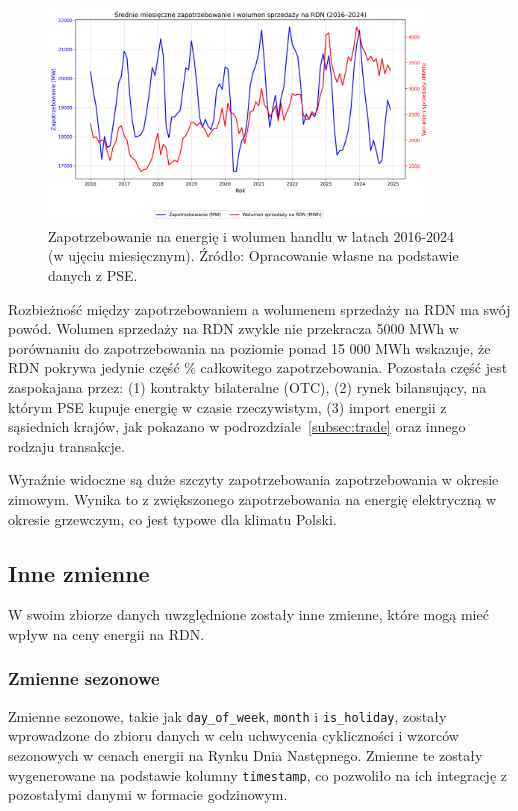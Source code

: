 \begin{figure}[H]
    \centering
    \includegraphics[width=0.9\textwidth]{../plots/market/load_vs_volume_2016_2024.png}
    \caption{Zapotrzebowanie na energię i wolumen handlu w latach 2016-2024 (w ujęciu miesięcznym). Źródło: Opracowanie własne na podstawie danych z PSE.}
    \label{fig:load_vs_trade_volume}
\end{figure}

Rozbieżność między zapotrzebowaniem a wolumenem sprzedaży na RDN ma swój powód. Wolumen sprzedaży na RDN zwykle nie przekracza 5000 MWh w porównaniu do zapotrzebowania na poziomie ponad 15 000  MWh wskazuje, że RDN pokrywa jedynie część \% całkowitego zapotrzebowania. Pozostała część jest zaspokajana przez: (1) kontrakty bilateralne (OTC), (2) rynek bilansujący, na którym PSE kupuje energię w czasie rzeczywistym, (3) import energii z sąsiednich krajów, jak pokazano w podrozdziale~\ref{subsec:trade} oraz innego rodzaju transakcje. 

Wyraźnie widoczne są duże szczyty zapotrzebowania zapotrzebowania w okresie zimowym. Wynika to z zwiększonego zapotrzebowania na energię elektryczną w okresie grzewczym, co jest typowe dla klimatu Polski.

\subsection{Inne zmienne}
\label{subsec:seasonal}

W swoim zbiorze danych uwzględnione zostały inne zmienne, które mogą mieć wpływ na ceny energii na RDN.

\subsubsection{Zmienne sezonowe}
\label{subsubsec:seasonal_variables}
Zmienne sezonowe, takie jak \texttt{day\_of\_week}, \texttt{month} i \texttt{is\_holiday}, zostały wprowadzone do zbioru danych w celu uchwycenia cykliczności i wzorców sezonowych w cenach energii na Rynku Dnia Następnego. Zmienne te zostały wygenerowane na podstawie kolumny \texttt{timestamp}, co pozwoliło na ich integrację z pozostałymi danymi w formacie godzinowym.

